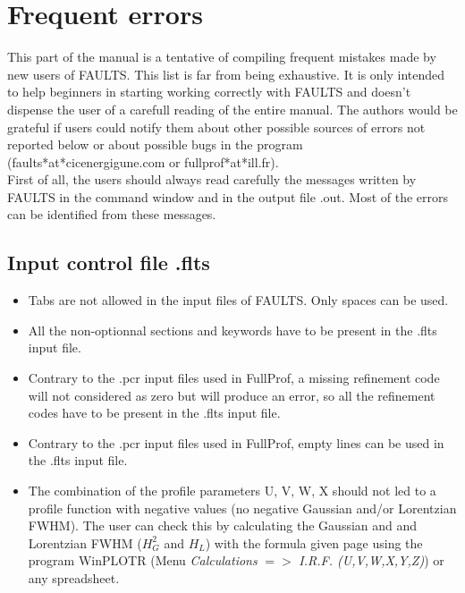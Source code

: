 \chapter{Frequent errors}
\label{freqerrors}



This part of the manual is a tentative of compiling frequent mistakes made by new users of FAULTS. This list is far from being exhaustive. It is only intended to help beginners in starting working correctly with FAULTS and doesn't dispense the user of a carefull reading of the entire manual. 
The authors would be grateful if users could notify them about other possible sources of errors not reported below or about possible bugs in the program (faults*at*cicenergigune.com or fullprof*at*ill.fr).\\

First of all, the users should always read carefully the messages written by FAULTS in the command window and in the output file .out. Most of the errors can be identified from these messages.\\


\section{Input control file .flts}

\begin{itemize}

	\item Tabs are not allowed in the input files of FAULTS. Only spaces can be used.

	\item All the non-optionnal sections and keywords have to be present in the .flts input file. 

	\item Contrary to the .pcr input files used in FullProf, a missing refinement code will not considered as zero but will produce an error, so all the refinement codes have to be present in the .flts input file. 

	\item Contrary to the .pcr input files used in FullProf, empty lines can be used in the .flts input file.

	\item The combination of the profile parameters U, V, W, X should not led to a profile function with negative values (no negative Gaussian and/or Lorentzian FWHM). The user can check this by calculating the Gaussian and and Lorentzian FWHM ($H_{G}^{2}$ and $H_{L}$) with the formula given page \pageref{FWHM} using the program  WinPLOTR \cite{WinplotrPaper, WinplotrWebsite} (Menu \emph{Calculations} $=$$>$ \emph{I.R.F. (U,V,W,X,Y,Z)}) or any spreadsheet.

\end{itemize}

